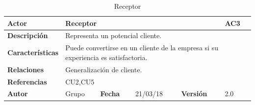 \documentclass[12pt,spanish]{article}
\begin{document}
\begin{table}[H]

\centering
\begin{tabular}{|m{3cm}|m{4cm}|m{2cm}|m{2cm}|m{2cm}|m{1cm}|}
\hline
\textbf{Actor} &  \multicolumn{4}{m{8cm}|}{Receptor} \vline &  \cellcolor{gray!40}AC3 \\
\hline
\textbf{Descripción} & \multicolumn{5}{m{8cm}|}{Representa un potencial cliente.} \\
\hline
\textbf{Características} & \multicolumn{5}{m{8cm}|}{Puede convertirse en un cliente de la empresa si su experiencia es satisfactoria.} \\
\hline
\textbf{Relaciones} &\multicolumn{5}{m{8cm}|}{Generalización de cliente.} \\
\hline
\textbf{Referencias} & \multicolumn{5}{m{8cm}|}{CU2,CU5} \\
\hline
\textbf{Autor} & Grupo & \textbf{Fecha} & 21/03/18 & \textbf{Versión} & 2.0 \\
\hline
\end{tabular}

\caption{Receptor}

\end{table}
\end{document}

